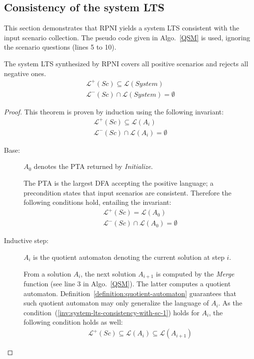 
\subsection{Consistency of the system LTS\label{subsection:system-lts-consistency}}

This section demonstrates that RPNI yields a system LTS consistent with the input scenario collection. The pseudo code given in Algo.~\ref{QSM} is used, ignoring the scenario questions (lines 5 to 10).

\begin{theorem}
\label{theorem:system-lts-consistency-with-sc}
The system LTS synthesized by RPNI covers all positive scenarios and rejects all negative ones.
\begin{align*}
&\mathcal{L}^+(Sc) \subseteq \mathcal{L}(System)\\
&\mathcal{L}^-(Sc) \cap      \mathcal{L}(System) = \emptyset
\end{align*}

\begin{proof}
This theorem is proven by induction using the following invariant:
\begin{align}
&\mathcal{L}^+(Sc) \subseteq \mathcal{L}(A_i)\label{inv:system-lts-consistency-with-sc-1}\\
&\mathcal{L}^-(Sc) \cap      \mathcal{L}(A_i) = \emptyset\label{inv:system-lts-consistency-with-sc-2}
\end{align}

\begin{description}
\item[Base:] $A_0$ denotes the PTA returned by \emph{Initialize}.

The PTA is the largest DFA accepting the positive language; a precondition states that input scenarios are consistent. Therefore the following conditions hold, entailing the invariant:
\begin{align}
&\mathcal{L}^+(Sc) =    \mathcal{L}(A_0)\\
&\mathcal{L}^-(Sc) \cap \mathcal{L}(A_0) = \emptyset
\end{align}

\item[Inductive step:] $A_i$ is the quotient automaton denoting the current solution at step $i$.

From a solution $A_i$, the next solution $A_{i+1}$ is computed by the \emph{Merge} function (see line 3 in Algo.~\ref{QSM}). The latter computes a quotient automaton. Definition~\ref{definition:quotient-automaton} guarantees that such quotient automaton may only generalize the language of $A_i$. As the condition~(\ref{inv:system-lts-consistency-with-sc-1}) holds for $A_i$, the following condition holds as well:
\begin{align*}
&\mathcal{L}^+(Sc) \subseteq \mathcal{L}(A_i) \subseteq \mathcal{L}(A_{i+1})
\end{align*}


\end{description}
\end{proof}
\end{theorem}
